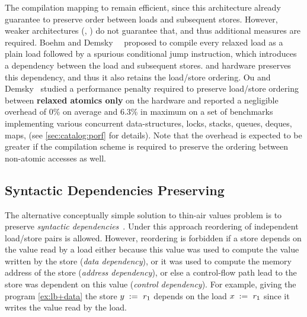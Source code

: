 The compilation mapping to \Intel remain efficient, 
since this architecture already guarantee to preserve order 
between loads and subsequent stores. 
However, weaker architectures (\ARM, \POWER) do not guarantee that, 
and thus additional measures are required.
Boehm and Demsky~\etal~\cite{Boehm-Demsky:MSPC14} proposed to 
compile every relaxed load as 
a plain load followed by a spurious conditional jump instruction,
which introduces a dependency between the load and subsequent stores. 
\ARM and \POWER hardware preserves this dependency, 
and thus it also retains the load/store ordering. 
Ou and Demsky~\cite{Ou-Demsky:OOPSLA18} studied 
a performance penalty required to preserve
load/store ordering between \textbf{relaxed atomics only}
on the  hardware and reported a negligible overhead
of 0\% on average and 6.3\% in maximum on a set of benchmarks
implementing various concurrent data-structures, 
\eg locks, stacks, queues, deques, maps, \etc 
(see \ref{sec:catalog:porf} for details).
Note that the overhead is expected to be greater 
if the compilation scheme is required to preserve the ordering 
between non-atomic accesses as well. 


\subsection{Syntactic Dependencies Preserving}
\label{sec:analysis:deprf}

The alternative conceptually simple solution 
to thin-air values problem is to preserve 
\emph{syntactic dependencies}~\cite{Boehm-Demsky:MSPC14, Alglave-al:ASPLOS18}.
Under this approach reordering of independent load/store pairs is allowed.
However, reordering is forbidden if a store depends on the value 
read by a load either because this value 
was used to compute the value written by the store (\emph{data dependency}), 
or it was used to compute 
the memory address of the store (\emph{address dependency}),
or else a control-flow path lead to the store was dependent
on this value (\emph{control dependency}).
For example, giving the program \ref{ex:lb+data} 
the store $y\;:=_{}\;r_1$ depends 
on the load $x\;:=_{}\;r_1$ since 
it writes the value read by the load.

